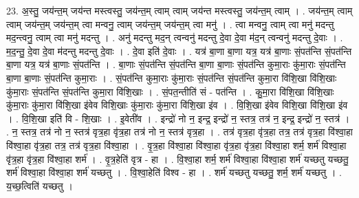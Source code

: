 \documentclass[17pt]{extarticle}
\begin{document}
23. अ॒स्तु॒ जय॑न्त॒म् जय॑न्त मस्त्वस्तु॒ जय॑न्त॒म् त्वाम् त्वाम् जय॑न्त मस्त्वस्तु॒ जय॑न्त॒म् त्वाम् । . जय॑न्त॒म् त्वाम् त्वाम् जय॑न्त॒म् जय॑न्त॒म् त्वा मन्वनु॒ त्वाम् जय॑न्त॒म् जय॑न्त॒म् त्वा मनु॑ । . त्वा मन्वनु॒ त्वाम् त्वा मनु॑ मदन्तु मद॒न्त्वनु॒ त्वाम् त्वा मनु॑ मदन्तु । . अनु॑ मदन्तु मद॒न् त्वन्वनु॑ मदन्तु दे॒वा दे॒वा म॑द॒न् त्वन्वनु॑ मदन्तु दे॒वाः । . म॒द॒न्तु॒ दे॒वा दे॒वा म॑दन्तु मदन्तु दे॒वाः । . दे॒वा इति॑ दे॒वाः । . यत्र॑ बा॒णा बा॒णा यत्र॒ यत्र॑ बा॒णाः सं॒पत॑न्ति सं॒पत॑न्ति बा॒णा यत्र॒ यत्र॑ बा॒णाः सं॒पत॑न्ति । . बा॒णाः सं॒पत॑न्ति सं॒पत॑न्ति बा॒णा बा॒णाः सं॒पत॑न्ति कुमा॒राः कु॑मा॒राः सं॒पत॑न्ति बा॒णा बा॒णाः सं॒पत॑न्ति कुमा॒राः । . सं॒पत॑न्ति कुमा॒राः कु॑मा॒राः सं॒पत॑न्ति सं॒पत॑न्ति कुमा॒रा वि॑शि॒खा वि॑शि॒खाः कु॑मा॒राः सं॒पत॑न्ति सं॒पत॑न्ति कुमा॒रा वि॑शि॒खाः । . सं॒पत॒न्तीति॑ सं - पत॑न्ति । . कु॒मा॒रा वि॑शि॒खा वि॑शि॒खाः कु॑मा॒राः कु॑मा॒रा वि॑शि॒खा इ॑वेव विशि॒खाः कु॑मा॒राः कु॑मा॒रा वि॑शि॒खा इ॑व । . वि॒शि॒खा इ॑वेव विशि॒खा वि॑शि॒खा इ॑व । . वि॒शि॒खा इति॑ वि - शि॒खाः । . इ॒वेती॑व । . इन्द्रो॑ नो न॒ इन्द्र॒ इन्द्रो॑ न॒ स्तत्र॒ तत्र॑ न॒ इन्द्र॒ इन्द्रो॑ न॒ स्तत्र॑ । . न॒ स्तत्र॒ तत्र॑ नो न॒ स्तत्र॑ वृत्र॒हा वृ॑त्र॒हा तत्र॑ नो न॒ स्तत्र॑ वृत्र॒हा । . तत्र॑ वृत्र॒हा वृ॑त्र॒हा तत्र॒ तत्र॑ वृत्र॒हा वि॑श्वा॒हा वि॑श्वा॒हा वृ॑त्र॒हा तत्र॒ तत्र॑ वृत्र॒हा वि॑श्वा॒हा । . वृ॒त्र॒हा वि॑श्वा॒हा वि॑श्वा॒हा वृ॑त्र॒हा वृ॑त्र॒हा वि॑श्वा॒हा शर्म॒ शर्म॑ विश्वा॒हा वृ॑त्र॒हा वृ॑त्र॒हा वि॑श्वा॒हा शर्म॑ । . वृ॒त्र॒हेति॑ वृत्र - हा । . वि॒श्वा॒हा शर्म॒ शर्म॑ विश्वा॒हा वि॑श्वा॒हा शर्म॑ यच्छतु यच्छतु॒ शर्म॑ विश्वा॒हा वि॑श्वा॒हा शर्म॑ यच्छतु । . वि॒श्वा॒हेति॑ विश्व - हा । . शर्म॑ यच्छतु यच्छतु॒ शर्म॒ शर्म॑ यच्छतु । . य॒च्छ॒त्विति॑ यच्छतु । \newline
\pagebreak
{}
\end{document}
